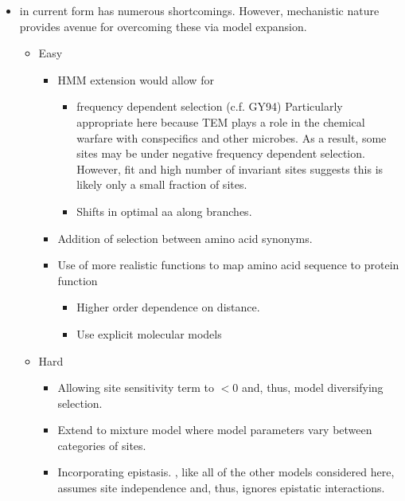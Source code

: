 \documentclass[12pt]{article}
\begin{document}
\begin{itemize}
\item \selac in current form has numerous shortcomings.  However, mechanistic nature provides avenue for overcoming these via model expansion.
  \begin{itemize}
  \item Easy
    \begin{itemize}
    \item HMM extension would allow for
      \begin{itemize}
      \item frequency dependent selection (c.f. GY94) Particularly appropriate here because TEM plays a role in the chemical warfare with conspecifics and other microbes.  As a result, some sites may be under negative frequency dependent selection.  However, \gy fit and high number of invariant sites suggests this is likely only a small fraction of sites.
      \item Shifts in optimal aa along branches.
      \end{itemize}
    \item Addition of selection between amino acid synonyms.
    \item Use of more realistic functions to map amino acid sequence to protein function
      \begin{itemize}
      \item Higher order dependence on \PC distance.
      \item Use explicit molecular models
      \end{itemize}
    \end{itemize}
  \item Hard
    \begin{itemize}
    \item Allowing site sensitivity term to $<0$ and, thus, model diversifying selection.
    \item Extend to mixture model where model parameters vary between categories of sites.
    \item Incorporating epistasis.  \selac, like all of the other models considered here, assumes site independence and, thus, ignores epistatic interactions.
    \end{itemize}
  \end{itemize}
  

\end{itemize}
\end{document}
